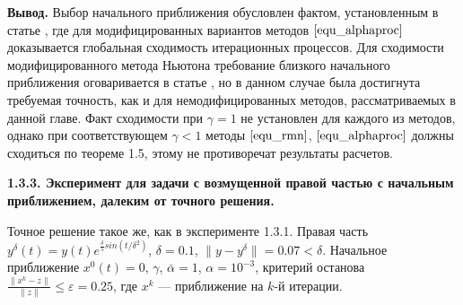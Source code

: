 {\bfseries\large Вывод.} Выбор начального приближения обусловлен фактом, установленным в статье \cite{Vasin2016}, где для модифицированных вариантов методов $\eqref{equ_alphaproc}$ доказывается глобальная сходимость итерационных процессов. Для сходимости модифицированного метода Ньютона требование близкого начального приближения оговаривается в статье \cite{VasAkiMin2013}, но в данном случае была достигнута требуемая точность, как и для немодифицированных методов, рассматриваемых в данной главе. Факт сходимости при $\gamma=1$ не установлен для каждого из методов, однако при соответствующем $\gamma<1$ методы $\eqref{equ_rmn}$, $\eqref{equ_alphaproc}$ должны сходиться по теореме 1.5, этому не противоречат результаты расчетов.

\newpage
{\bfseries 1.3.3. Эксперимент для задачи с возмущенной правой частью с начальным приближением, далеким от точного решения.} 

Точное решение такое же, как в эксперименте 1.3.1. Правая часть $y^\delta(t)=y(t)e^{\frac{\delta}{5} sin(t/{\delta}^2)}$, $\delta=0.1$, $\|y-y^{\delta}\|=0.07<\delta$. Начальное приближение $x^0(t)=0$, $\gamma$, $\bar\alpha=1$, $\alpha=10^{-3}$, критерий останова $\frac{\|x^k-z\|}{\|z\|}\le\varepsilon=0.25$, где $x^k$ --- приближение на $k$-й итерации. 

